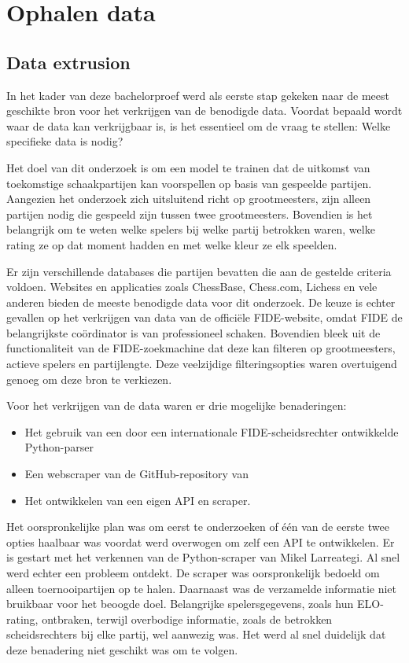 \section{Ophalen data}

\subsection{Data extrusion}

In het kader van deze bachelorproef werd als eerste stap gekeken naar de meest geschikte bron voor het verkrijgen van de benodigde data. Voordat bepaald wordt waar de data kan verkrijgbaar is, is het essentieel om de vraag te stellen: Welke specifieke data is nodig?

Het doel van dit onderzoek is om een model te trainen dat de uitkomst van toekomstige schaakpartijen kan voorspellen op basis van gespeelde partijen. Aangezien het onderzoek zich uitsluitend richt op grootmeesters, zijn alleen partijen nodig die gespeeld zijn tussen twee grootmeesters. Bovendien is het belangrijk om te weten welke spelers bij welke partij betrokken waren, welke rating ze op dat moment hadden en met welke kleur ze elk speelden.

Er zijn verschillende databases die partijen bevatten die aan de gestelde criteria voldoen. Websites en applicaties zoals ChessBase, Chess.com, Lichess en vele anderen bieden de meeste benodigde data voor dit onderzoek. De keuze is echter gevallen op het verkrijgen van data van de officiële FIDE-website, omdat FIDE de belangrijkste coördinator is van professioneel schaken. Bovendien bleek uit de functionaliteit van de FIDE-zoekmachine dat deze kan filteren op grootmeesters, actieve spelers en partijlengte. Deze veelzijdige filteringsopties waren overtuigend genoeg om deze bron te verkiezen.

Voor het verkrijgen van de data waren er drie mogelijke benaderingen:

\begin{itemize}
    \item Het gebruik van een door een internationale FIDE-scheidsrechter ontwikkelde Python-parser \autocite{Larreategi}
    \item Een webscraper van de GitHub-repository van \textcite{Alves2020}
    \item Het ontwikkelen van een eigen API en scraper.
\end{itemize}

Het oorspronkelijke plan was om eerst te onderzoeken of één van de eerste twee opties haalbaar was voordat werd overwogen om zelf een API te ontwikkelen. Er is gestart met het verkennen van de Python-scraper van Mikel Larreategi. Al snel werd echter een probleem ontdekt. De scraper was oorspronkelijk bedoeld om alleen toernooipartijen op te halen. Daarnaast was de verzamelde informatie niet bruikbaar voor het beoogde doel. Belangrijke spelersgegevens, zoals hun ELO-rating, ontbraken, terwijl overbodige informatie, zoals de betrokken scheidsrechters bij elke partij, wel aanwezig was. Het werd al snel duidelijk dat deze benadering niet geschikt was om te volgen.

